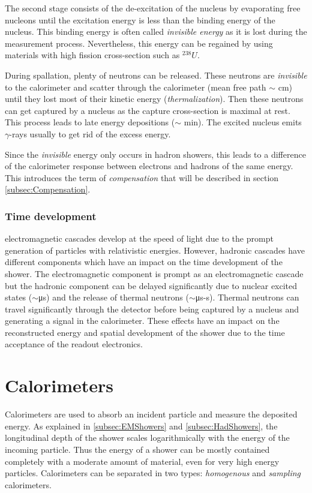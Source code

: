 The second stage consists of the de-excitation of the nucleus by evaporating free nucleons until the excitation energy is less than the binding energy of the nucleus. This binding energy is often called \textit{invisible energy} as it is lost during the measurement process. Nevertheless, this energy can be regained by using materials with high fission cross-section such as $^{238}U$.

During spallation, plenty of neutrons can be released. These neutrons are \textit{invisible} to the calorimeter and scatter through the calorimeter (mean free path $\sim$ cm) until they lost most of their kinetic energy (\textit{thermalization}). Then these neutrons can get captured by a nucleus as the capture cross-section is maximal at rest. This process leads to late energy depositions ($\sim$ min). The excited nucleus emits $\gamma$-rays usually to get rid of the excess energy.

Since the \textit{invisible} energy only occurs in hadron showers, this leads to a difference of the calorimeter response between electrons and hadrons of the same energy. This introduces the term of \textit{compensation} that will be described in section \ref{subsec:Compensation}.

\subsubsection{Time development}
\label{sec:TimeDevShowers}

electromagnetic cascades develop at the speed of light due to the prompt generation of particles with relativistic energies. However, hadronic cascades have different components which have an impact on the time development of the shower. The electromagnetic component is prompt as an electromagnetic cascade but the hadronic component can be delayed significantly due to nuclear excited states ($\sim$\si{\micro\second}) and the release of thermal neutrons ($\sim$\si{\micro\second}-\si{\second}). Thermal neutrons can travel significantly through the detector before being captured by a nucleus and generating a signal in the calorimeter. These effects have an impact  on the reconstructed energy and spatial development of the shower due to the time acceptance of the readout electronics.

\section{Calorimeters}

Calorimeters are used to absorb an incident particle and measure the deposited energy. As explained in \ref{subsec:EMShowers} and \ref{subsec:HadShowers}, the longitudinal depth of the shower scales logarithmically with the energy of the incoming particle. Thus the energy of a shower can be mostly contained completely with a moderate amount of material, even for very high energy particles. Calorimeters can be separated in two types: \textit{homogenous} and \textit{sampling} calorimeters.

